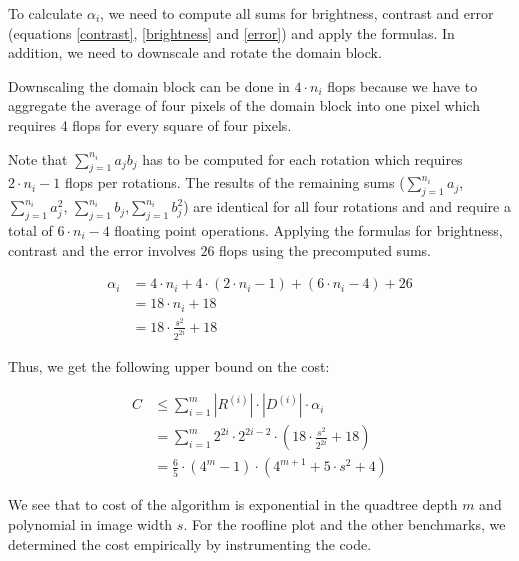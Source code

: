 To calculate $\alpha_{i}$, we need to compute all sums for brightness,
contrast and error (equations \eqref{contrast}, \eqref{brightness} and
\eqref{error}) and apply the formulas. In addition, we need to downscale and
rotate the domain block.

Downscaling the domain block can be done in $4\cdot n_{i}$ flops because we have
to aggregate the average of four pixels of the domain block into one pixel which
requires 4 flops for every square of four pixels.

Note that $\sum_{j=1}^{n_{i}} a_j b_j$ has to be computed for each rotation
which requires $2\cdot n_{i}-1$ flops per rotations. The results of the
remaining sums ($\sum_{j=1}^{n_{i}} a_j$, $\sum_{j=1}^{n_{i}} a_j^2$,
$\sum_{j=1}^{n_{i}} b_j$,$\sum_{j=1}^{n_{i}} b_j^2$) are identical for all four
rotations and and require a total of $6\cdot n_{i}-4$ floating point operations.
Applying the formulas for brightness, contrast and the error involves $26$ flops
using the precomputed sums.

\begin{align*}
  \alpha_i &= 4\cdot n_{i} + 4 \cdot (2\cdot n_{i}-1) + (6\cdot n_{i}-4) +  26\\
           &= 18\cdot n_{i} + 18 \\
           &= 18 \cdot \frac{s^2}{2^{2i}} + 18
\end{align*}

Thus, we get the following upper bound on the cost:

\begin{align*}
C &\leq \sum_{i=1}^m |R^{(i)}| \cdot |D^{(i)}| \cdot \alpha_i \\
  &= \sum_{i=1}^m 2^{2i} \cdot 2^{2i-2} \cdot (18 \cdot \frac{s^2}{2^{2i}} + 18) \\
  &= \frac{6}{5}\cdot (4^{m}-1)\cdot (4^{m+1} + 5\cdot s^{2} + 4)
\end{align*}

We see that to cost of the algorithm is exponential in the quadtree depth $m$
and polynomial in image width $s$. For the roofline plot and the other benchmarks,
we determined the cost empirically by instrumenting the code.

